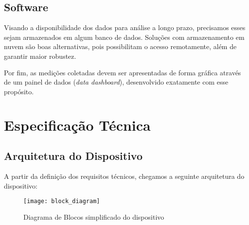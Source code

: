 \documentclass[../monografia.tex]{subfiles}
\begin{document}
\subsection{Software}

Visando a disponibilidade dos dados para análise a longo prazo, precisamos esses sejam armazenados em algum banco de dados. Soluções com armazenamento em nuvem são boas alternativas, pois possibilitam o acesso remotamente, além de garantir maior robustez.

Por fim, as medições coletadas devem ser apresentadas de forma gráfica através de um painel de dados (\textit{data dashboard}), desenvolvido exatamente com esse propósito. 


\section{Especificação Técnica}%

\subsection{Arquitetura do Dispositivo} 
A partir da definição dos requisitos técnicos, chegamos a seguinte arquitetura do dispositivo:

\begin{figure}[h]
    \centering
    \texttt{[image: block\_diagram]}
    \caption{Diagrama de Blocos simplificado do dispositivo}
    \label{fig:Diagrama de Blocos}
\end{figure}
\end{document}

